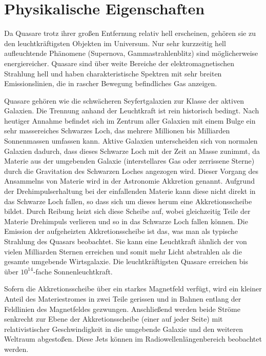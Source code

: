 
\chapter{Physikalische Eigenschaften}
\label{chapter-kapitel2}

Da Quasare trotz ihrer großen Entfernung relativ hell erscheinen, gehören sie zu den leuchtkräftigsten Objekten im Universum. Nur sehr kurzzeitig hell aufleuchtende Phänomene (Supernova, Gammastrahlenblitz) sind möglicherweise energiereicher. Quasare sind über weite Bereiche der elektromagnetischen Strahlung hell und haben charakteristische Spektren mit sehr breiten Emissionslinien, die in rascher Bewegung befindliches Gas anzeigen.

Quasare gehören wie die schwächeren Seyfertgalaxien zur Klasse der aktiven Galaxien. Die Trennung anhand der Leuchtkraft ist rein historisch bedingt. Nach heutiger Annahme befindet sich im Zentrum aller Galaxien mit einem Bulge ein sehr massereiches Schwarzes Loch, das mehrere Millionen bis Milliarden Sonnenmassen umfassen kann. Aktive Galaxien unterscheiden sich von normalen Galaxien dadurch, dass dieses Schwarze Loch mit der Zeit an Masse zunimmt, da Materie aus der umgebenden Galaxie (interstellares Gas oder zerrissene Sterne) durch die Gravitation des Schwarzen Loches angezogen wird. Dieser Vorgang des Ansammelns von Materie wird in der Astronomie Akkretion genannt. Aufgrund der Drehimpuls­erhaltung bei der einfallenden Materie kann diese nicht direkt in das Schwarze Loch fallen, so dass sich um dieses herum eine Akkretionsscheibe bildet. Durch Reibung heizt sich diese Scheibe auf, wobei gleichzeitig Teile der Materie Drehimpuls verlieren und so in das Schwarze Loch fallen können. Die Emission der aufgeheizten Akkretionsscheibe ist das, was man als typische Strahlung des Quasars beobachtet. Sie kann eine Leuchtkraft ähnlich der von vielen Milliarden Sternen erreichen und somit mehr Licht abstrahlen als die gesamte umgebende Wirtsgalaxie. Die leuchtkräftigsten Quasare erreichen bis über $10^{14}$-fache Sonnenleuchtkraft.

Sofern die Akkretionsscheibe über ein starkes Magnetfeld verfügt, wird ein kleiner Anteil des Materiestromes in zwei Teile gerissen und in Bahnen entlang der Feldlinien des Magnetfeldes gezwungen. Anschließend werden beide Ströme senkrecht zur Ebene der Akkretionsscheibe (einer auf jeder Seite) mit relativistischer Geschwindigkeit in die umgebende Galaxie und den weiteren Weltraum abgestoßen. Diese Jets können im Radiowellen­längenbereich beobachtet werden.